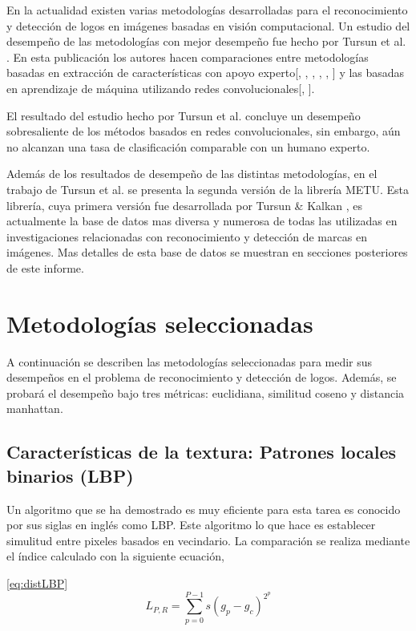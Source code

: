 \documentclass[conference]{IEEEtran}
\begin{document}
En la actualidad existen varias metodologías desarrolladas para el reconocimiento y detección de logos en imágenes basadas en visión computacional. Un estudio del desempeño de las metodologías con mejor desempeño fue hecho por Tursun et al. \cite{metuV2}. En esta publicación los autores hacen comparaciones entre metodologías basadas en extracción de características con apoyo experto[\cite{bowd}, \cite{colorHist}, \cite{GIST}, \cite{kpoint}, \cite{LBP}, \cite{shape}] y las basadas en aprendizaje de máquina utilizando redes convolucionales[\cite{cnn1}, \cite{cnn2}]. 

El resultado del estudio hecho por Tursun et al. \cite{metuV2} concluye un desempeño sobresaliente de los métodos basados en redes convolucionales, sin embargo, aún no alcanzan una tasa de clasificación comparable con un humano experto. 

Además de los resultados de desempeño de las distintas metodologías, en el trabajo de Tursun et al. \cite{metuV2} se presenta la segunda versión de la librería METU. Esta librería, cuya primera versión fue desarrollada por Tursun \& Kalkan \cite{metuV1}, es actualmente la base de datos mas diversa y numerosa de todas las utilizadas en investigaciones relacionadas con reconocimiento y detección de marcas en imágenes. Mas detalles de esta base de datos se muestran en secciones posteriores de este informe. 


\section{Metodologías seleccionadas}
A continuación se describen las metodologías seleccionadas para medir sus desempeños en el problema de reconocimiento y detección de logos. Además, se probará el desempeño bajo tres métricas: euclidiana, similitud coseno y distancia manhattan.

\subsection{Caracter\'isticas de la textura: Patrones locales binarios (LBP)}

Un algoritmo que se ha demostrado es muy eficiente para esta tarea es conocido por sus siglas en inglés como LBP\cite{LBP}. Este algoritmo lo que hace es establecer simulitud entre pixeles basados en vecindario. La comparación se realiza mediante el índice calculado con la siguiente ecuación,

\ref{eq:distLBP} 
	\begin{equation}
	L_{P,R} = \sum_{p=0}^{P-1} s{(g_p - g_c)}^{{2}^p}
	\label{eq:distLBP}
\end{equation}
\end{document}

